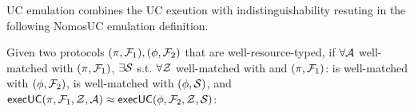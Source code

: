 UC emulation combines the UC exeution with indistinguishability resuting in the following NomosUC emulation definition.
\begin{definition}[Emulation]\label{def:emulation}
Given two protocols $(\pi, \F_1), (\phi, \F_2)$ that are well-resource-typed, if $\forall \A$ well-matched with $(\pi, \F_1)$, $\exists \Sim$ s.t. $\forall \Z$ well-matched with \A and $(\pi, \F_1)$: \Sim is well-matched with $(\phi, \F_2)$, \Z is well-matched with $(\phi, \Sim)$, and $\msf{execUC}(\pi, \F_1, \Z, \A) \approx \msf{execUC}(\phi, \F_2, \Z, \Sim)$:

\begin{mathpar}
\footnotesize
\end{mathpar}
\end{definition}
